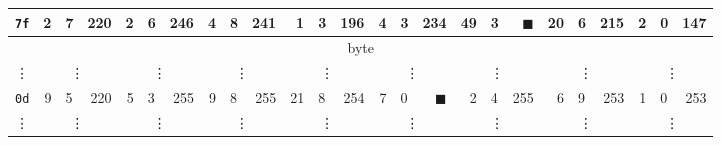 \begin{tabular}{| c | r@{.} l@{\quad}r | r@{.} l@{\quad}r | r@{.} l@{\quad}r | r@{.} l@{\quad}r | r@{.} l@{\quad}r | r@{.} l@{\quad}r | r@{.} l@{\quad}r | r@{.} l@{\quad}r |}
	\hline
	{\tt 7f}&2&7&220&2&6&246&4&8&241&1&3&196&4&3&234&49&3&$\blacksquare$&20&6&215&2&0&147\\
	\hline
	\hline
	\multicolumn{25}{|c|}{\nth{11} byte} \\
	\hline
	\vdots & \multicolumn{3}{c|}{\vdots} & \multicolumn{3}{c|}{\vdots} & \multicolumn{3}{c|}{\vdots} & \multicolumn{3}{c|}{\vdots} & \multicolumn{3}{c|}{\vdots} & \multicolumn{3}{c|}{\vdots} & \multicolumn{3}{c|}{\vdots} & \multicolumn{3}{c|}{\vdots} \\
	\hline
	{\tt 0d}&9&5&220&5&3&255&9&8&255&21&8&254&7&0&$\blacksquare$&2&4&255&6&9&253&1&0&253\\
	\hline
	\vdots & \multicolumn{3}{c|}{\vdots} & \multicolumn{3}{c|}{\vdots} & \multicolumn{3}{c|}{\vdots} & \multicolumn{3}{c|}{\vdots} & \multicolumn{3}{c|}{\vdots} & \multicolumn{3}{c|}{\vdots} & \multicolumn{3}{c|}{\vdots} & \multicolumn{3}{c|}{\vdots} \\
	\hline
\end{tabular}